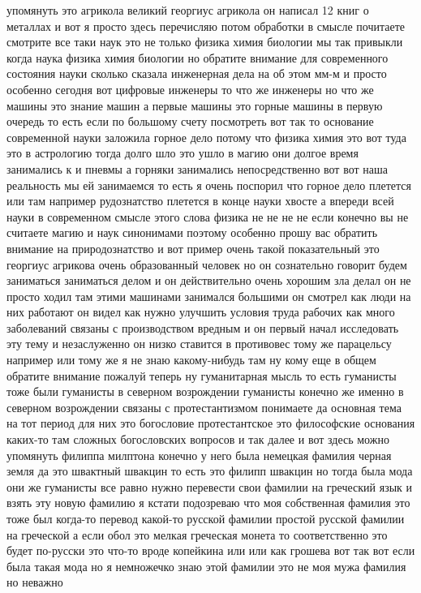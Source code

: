 упомянуть это агрикола великий георгиус агрикола он написал 12 книг о металлах и
вот я просто здесь перечисляю потом обработки в смысле почитаете смотрите все
таки наук это не только физика химия биологии мы так привыкли когда наука физика
химия биологии но обратите внимание для современного состояния науки сколько
сказала инженерная дела на об этом мм-м и просто особенно сегодня вот цифровые
инженеры то что же инженеры но что же машины это знание машин а первые машины
это горные машины в первую очередь то есть если по большому счету посмотреть вот
так то основание современной науки заложила горное дело потому что физика химия
это вот туда это в астрологию тогда долго шло это ушло в магию они долгое время
занимались к и пневмы а горняки занимались непосредственно вот вот наша
реальность мы ей занимаемся то есть я очень поспорил что горное дело плетется
или там например рудознатство плетется в конце науки хвосте а впереди всей науки
в современном смысле этого слова физика не не не не если конечно вы не считаете
магию и наук синонимами поэтому особенно прошу вас обратить внимание на
природознатство и вот пример очень такой показательный это георгиус агрикова
очень образованный человек но он сознательно говорит будем заниматься заниматься
делом и он действительно очень хорошим зла делал он не просто ходил там этими
машинами занимался большими он смотрел как люди на них работают он видел как
нужно улучшить условия труда рабочих как много заболеваний связаны с
производством вредным и он первый начал исследовать эту тему и незаслуженно он
низко ставится в противовес тому же парацельсу например или тому же я не знаю
какому-нибудь там ну кому еще в общем обратите внимание пожалуй теперь ну
гуманитарная мысль то есть гуманисты тоже были гуманисты в северном возрождении
гуманисты конечно же именно в северном возрождении связаны с протестантизмом
понимаете да основная тема на тот период для них это богословие протестантское
это философские основания каких-то там сложных богословских вопросов и так далее
и вот здесь можно упомянуть филиппа милптона конечно у него была немецкая
фамилия черная земля да это швактный швакцин то есть это филипп швакцин но тогда
была мода они же гуманисты все равно нужно перевести свои фамилии на греческий
язык и взять эту новую фамилию я кстати подозреваю что моя собственная фамилия
это тоже был когда-то перевод какой-то русской фамилии простой русской фамилии
на греческой а если обол это мелкая греческая монета то соответственно это будет
по-русски это что-то вроде копейкина или или как грошева вот так вот если была
такая мода но я немножечко знаю этой фамилии это не моя мужа фамилия но неважно
